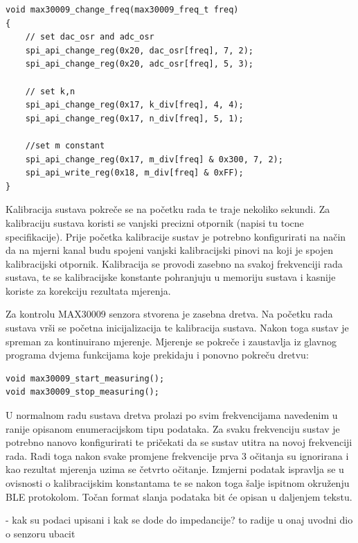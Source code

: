 \documentclass[../diplomski_rad.tex]{subfiles}
\begin{document}
\begin{lstlisting}[label={lst:promjena_frekvencije},style=CStyle,caption={Funkcija za promjenu frekvenciju sustava},captionpos=b]
void max30009_change_freq(max30009_freq_t freq)
{
    // set dac_osr and adc_osr
    spi_api_change_reg(0x20, dac_osr[freq], 7, 2);
    spi_api_change_reg(0x20, adc_osr[freq], 5, 3);

    // set k,n
    spi_api_change_reg(0x17, k_div[freq], 4, 4);
    spi_api_change_reg(0x17, n_div[freq], 5, 1);

    //set m constant
    spi_api_change_reg(0x17, m_div[freq] & 0x300, 7, 2);         
    spi_api_write_reg(0x18, m_div[freq] & 0xFF);
}
\end{lstlisting}

Kalibracija sustava pokreče se na početku rada te traje nekoliko sekundi.
Za kalibraciju sustava koristi se vanjski precizni otpornik (napisi tu tocne specifikacije). 
Prije početka kalibracije sustav je potrebno konfigurirati na način da na mjerni kanal budu spojeni 
vanjski kalibracijski pinovi na koji je spojen kalibracijski otpornik. 
Kalibracija se provodi zasebno na svakoj frekvenciji rada sustava, te se kalibracijske konstante pohranjuju 
u memoriju sustava i kasnije koriste za korekciju rezultata mjerenja. 

Za kontrolu MAX30009 senzora stvorena je zasebna dretva. Na početku rada sustava vrši se početna inicijalizacija te 
kalibracija sustava. Nakon toga sustav je spreman za kontinuirano mjerenje. Mjerenje se pokreče i zaustavlja iz 
glavnog programa dvjema funkcijama koje prekidaju i ponovno pokreču dretvu:
\begin{lstlisting}[label={lst:max30009_kontrola},style=CStyle,caption={Funkcije za početak i prekid mjerenja},captionpos=b]
void max30009_start_measuring();
void max30009_stop_measuring();
\end{lstlisting}
U normalnom radu sustava dretva prolazi po svim frekvencijama navedenim u ranije opisanom enumeracijskom tipu podataka. 
Za svaku frekvenciju sustav je potrebno nanovo konfigurirati te pričekati da se sustav utitra na novoj frekvenciji rada. 
Radi toga nakon svake promjene frekvencije prva 3 očitanja su ignorirana i kao rezultat mjerenja uzima se četvrto očitanje. 
Izmjerni podatak ispravlja se u ovisnosti o kalibracijskim konstantama te se nakon toga šalje ispitnom okruženju BLE protokolom. 
Točan format slanja podataka bit će opisan u daljenjem tekstu.

- kak su podaci upisani i kak se dode do impedancije? to radije u onaj uvodni dio o senzoru ubacit
\end{document}
